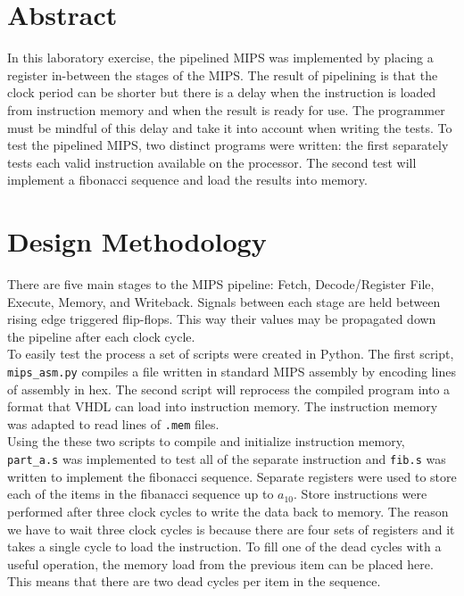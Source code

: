 \documentclass[CMPE]{../KGCOEReport}
\def\code#1{\texttt{#1}}
\begin{document}
    \maketitle
    \section*{Abstract}

    In this laboratory exercise, the pipelined MIPS was implemented by
    placing a register in-between the stages of the MIPS. The result of
    pipelining is that the clock period can be shorter but there is a
    delay when the instruction is loaded from instruction memory and when
    the result is ready for use. The programmer must be mindful of this
    delay and take it into account when writing the tests. To test the
    pipelined MIPS, two distinct programs were written: the first separately
    tests each valid instruction available on the processor. The second test
    will implement a fibonacci sequence and load the results into memory.

    \section*{Design Methodology}
	There are five main stages to the MIPS pipeline: Fetch, Decode/Register File,
	Execute, Memory, and Writeback. Signals between each stage are held between
	rising edge triggered flip-flops. This way their values may be propagated
	down the pipeline after each clock cycle.
    \\
    
    To easily test the process a set of scripts were created in Python. The
    first script, \code{mips\_asm.py} compiles a file written in standard MIPS
    assembly by encoding lines of assembly in hex. The second script will
    reprocess the compiled program into a format that VHDL can load 
    into instruction memory. The instruction memory was adapted to read lines
    of \code{.mem} files.
    \\
	
	Using the these two scripts to compile and initialize instruction memory,
	\code{part\_a.s} was implemented to test all of the separate instruction
	and \code{fib.s} was written to implement the fibonacci sequence. Separate
	registers were used to store each of the items in the fibanacci sequence
	up to $a_{10}$. Store instructions were performed after three clock cycles
	to write the data back to memory. The reason we have to wait three clock
	cycles is because there are four sets of registers and it takes a single
	cycle to load the instruction. To fill one of the dead cycles with a useful
	operation, the memory load from the previous item can be placed here. This
	means that there are two dead cycles per item in the sequence.
	\\
	
\end{document}
